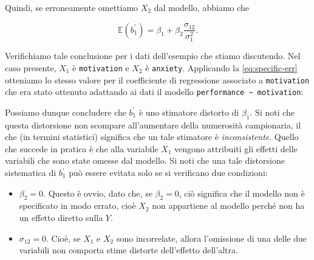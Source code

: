 \documentclass[
  11pt,
]{krantz}
\makeatletter
\newenvironment{Shaded}{\begin{snugshade}}{\end{snugshade}}
\newcommand{\CommentTok}[1]{\textcolor[rgb]{0.37,0.37,0.37}{\textit{#1}}}
\newcommand{\DecValTok}[1]{\textcolor[rgb]{0.06,0.06,0.06}{#1}}
\newcommand{\FunctionTok}[1]{\textcolor[rgb]{0,0,0}{#1}}
\newcommand{\NormalTok}[1]{#1}
\newcommand{\SpecialCharTok}[1]{\textcolor[rgb]{0,0,0}{#1}}
\providecommand{\tightlist}{%
  \setlength{\itemsep}{0pt}\setlength{\parskip}{0pt}}
\newenvironment{kframe}{%
\medskip{}
\setlength{\fboxsep}{.8em}
 \def\at@end@of@kframe{}%
 \ifinner\ifhmode%
  \def\at@end@of@kframe{\end{minipage}}%
  \begin{minipage}{\columnwidth}%
 \fi\fi%
 \def\FrameCommand##1{\hskip\@totalleftmargin \hskip-\fboxsep
 \colorbox{shadecolor}{##1}\hskip-\fboxsep
     \hskip-\linewidth \hskip-\@totalleftmargin \hskip\columnwidth}%
 \MakeFramed {\advance\hsize-\width
   \@totalleftmargin\z@ \linewidth\hsize
   \@setminipage}}%
 {\par\unskip\endMakeFramed%
 \at@end@of@kframe}
\renewenvironment{Shaded}{\begin{kframe}}{\end{kframe}}
\theoremstyle{definition}
\theoremstyle{definition}
\theoremstyle{definition}
\theoremstyle{definition}
\theoremstyle{remark}
\makeatother
\begin{document}
Quindi, se erroneamente omettiamo \(X_2\) dal modello, abbiamo che

\begin{equation}
\mathbb{E}(b_1^\prime) = \beta_1 + \beta_2 \frac{\sigma_{12}}{\sigma_1^2}.
\label{eq:specific-err}
\end{equation}

Verifichiamo tale conclusione per i dati dell'esempio che stiamo discutendo. Nel caso presente, \(X_1\) è \texttt{motivation} e \(X_2\) è \texttt{anxiety}. Applicando la \eqref{eq:specific-err} otteniamo lo stesso valore per il coefficiente di regressione associato a \texttt{motivation} che era stato ottenuto adattando ai dati il modello \texttt{performance\ \textasciitilde{}\ motivation}:

\begin{Shaded}
\end{Shaded}

Possiamo dunque concludere che \(b_1^\prime\) è uno stimatore distorto di \(\beta_1\). Si noti che questa distorsione non scompare all'aumentare della numerosità campionaria, il che (in termini statistici) significa che un tale stimatore è \emph{inconsistente}. Quello che succede in pratica è che alla variabile \(X_1\) vengono attribuiti gli effetti delle variabili che sono state omesse dal modello. Si noti che una tale distorsione sistematica di \(b_1^\prime\) può essere evitata solo se si verificano due condizioni:

\begin{itemize}
\tightlist
\item
  \(\beta_2 = 0\). Questo è ovvio, dato che, se \(\beta_2 = 0\), ciò significa che il modello non è specificato in modo errato, cioè \(X_2\) non appartiene al modello perché non ha un effetto diretto sulla \(Y\).
\item
  \(\sigma_{12} = 0\). Cioè, se \(X_1\) e \(X_2\) sono incorrelate, allora l'omissione di una delle due variabili non comporta stime distorte dell'effetto dell'altra.
\end{itemize}
\end{document}
